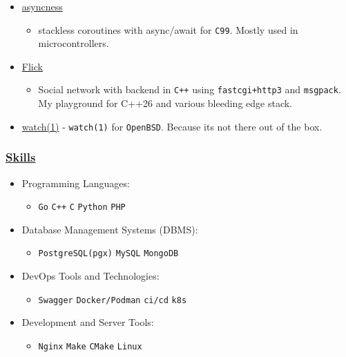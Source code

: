 \begin{itemize}
\tightlist
\item
  \href{https://github.com/ssleert/asyncness}{asyncness}

  \begin{itemize}
  \tightlist
  \item
    stackless coroutines with async/await for \texttt{C99}. Mostly used
    in microcontrollers.
  \end{itemize}
\item
  \href{https://github.com/ssleert/flick}{Flick}

  \begin{itemize}
  \tightlist
  \item
    Social network with backend in \texttt{C++} using
    \texttt{fastcgi+http3} and \texttt{msgpack}. My playground for C++26
    and various bleeding edge stack.
  \end{itemize}
\item
  \href{https://github.com/ssleert/watch}{watch(1)} - \texttt{watch(1)}
  for \texttt{OpenBSD}. Because it\textquotesingle s not there out of
  the box.
\end{itemize}

\label{Ryabinkovux20Semyonux20Pavlovich-Skills}
\subsubsection{\texorpdfstring{\hyperref[Ryabinkovux5cux2520Semyonux5cux2520Pavlovich-Skills]{Skills}}{Skills}}\label{Skills}

\begin{itemize}
\tightlist
\item
  Programming Languages:

  \begin{itemize}
  \tightlist
  \item
    \texttt{Go} \texttt{C++} \texttt{C} \texttt{Python} \texttt{PHP}
  \end{itemize}
\item
  Database Management Systems (DBMS):

  \begin{itemize}
  \tightlist
  \item
    \texttt{PostgreSQL(pgx)} \texttt{MySQL} \texttt{MongoDB}
  \end{itemize}
\item
  DevOps Tools and Technologies:

  \begin{itemize}
  \tightlist
  \item
    \texttt{Swagger} \texttt{Docker/Podman} \texttt{ci/cd} \texttt{k8s}
  \end{itemize}
\item
  Development and Server Tools:

  \begin{itemize}
  \tightlist
  \item
    \texttt{Nginx} \texttt{Make} \texttt{CMake} \texttt{Linux}
  \end{itemize}
\end{itemize}
